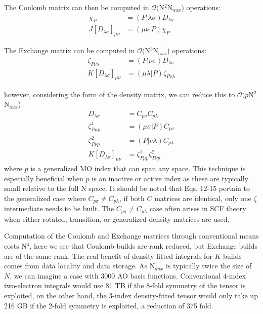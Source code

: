 \documentclass[aip,jcp,preprint,superscriptaddress,floatfix]{revtex4-1}
\begin{document}
The Coulomb matrix can then be computed in $\mathcal{O}($N$^2$N$_{aux}$) operations:
\begin{align}
\chi_P &= (P| \lambda \sigma) D_{ \lambda \sigma} \\
J[D_{ \lambda \sigma}]_{\mu \nu} &= (\mu \nu |P) \chi_P
\end{align}

The Exchange matrix can be computed in $\mathcal{O}($N$^3$N$_{aux}$) operations:
\begin{align}
\zeta_{P \nu\lambda} &= (P| \nu \sigma) D_{ \lambda \sigma} \\
K[D_{ \lambda \sigma}]_{\mu \nu} &= (\mu \lambda |P) \zeta_{P\nu\lambda} 
\end{align}

however, considering the form of the density matrix, we can reduce this to $\mathcal{O}(p$N$^2$N$_{aux}$)
\begin{align}
D_{\lambda \sigma} &= C_{p\sigma}C_{p\lambda}\\
\zeta^1_{P \mu p} &= (\mu \sigma | P) C_{ p \sigma} \\
\zeta^2_{P \nu p} &= (P| \nu \lambda) C_{ p \lambda} \\
K[D_{ \lambda \sigma}]_{\mu \nu} &= \zeta^1_{P \mu p} \zeta^2_{P \nu p}
\end{align}
where $p$ is a generalized MO index that can span any space.
This technique is especially beneficial when $p$ is an inactive or active index as these are typically small relative to the full N space.
It should be noted that Eqs. 12-15 pertain to the generalized case where $C_{p\sigma} \neq C_{p\lambda}$, if both $C$ matrices are identical, only one $\zeta$ intermediate needs to be built.
The $C_{p\sigma} \neq C_{p\lambda}$ case often arises in SCF theory when either rotated, transition, or generalized density matrices are used.

Computation of the Coulomb and Exchange matrices through conventional means costs N$^4$, here we see that Coulomb builds are rank reduced, but Exchange builds are of the same rank.
The real benefit of density-fitted integrals for $K$ builds comes from data locality and data storage.
As N$_{aux}$ is typically twice the size of $N$, we can imagine a case with 3000 AO basis functions.
Conventional 4-index two-electron integrals would use 81 TB if the 8-fold symmetry of the tensor is exploited, on the other hand, the 3-index density-fitted tensor would only take up 216 GB if the 2-fold symmetry is exploited, a reduction of 375 fold.





\end{document}
